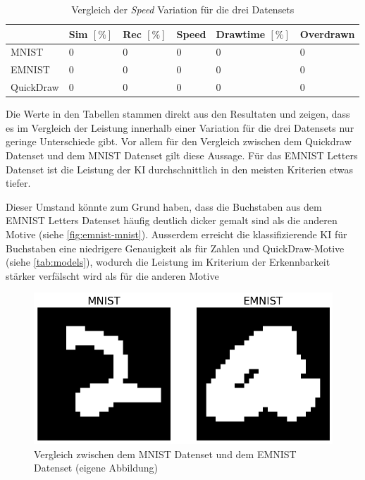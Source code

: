 \begin{table}[!ht]
    \centering
    \caption{Vergleich der \emph{Speed} Variation für die drei Datensets}\label{tab:speed-3-dataset}
    \begin{tabular}{|l|l|l|l|l|l|}
            \hline
            \hline ~ & Sim $[\%]$ & Rec $[\%]$ & Speed & Drawtime $[\%]$ & Overdrawn \\ \hline
            MNIST & 0 & 0 & 0 & 0 & 0 \\ \hline
            EMNIST & 0 & 0 & 0 & 0 & 0 \\ \hline
            QuickDraw & 0 & 0 & 0 & 0 & 0 \\ \hline
        \end{tabular}
\end{table}

Die Werte in den Tabellen stammen direkt aus den Resultaten und zeigen, dass es
im Vergleich der Leistung innerhalb einer Variation für die drei Datensets nur
geringe Unterschiede gibt. Vor allem für den Vergleich zwischen dem Quickdraw
Datenset und dem MNIST Datenset gilt diese Aussage. Für das EMNIST Letters
Datenset ist die Leistung der KI durchschnittlich in den meisten Kriterien etwas
tiefer.

Dieser Umstand könnte zum Grund haben, dass die Buchstaben aus dem EMNIST
Letters Datenset häufig deutlich dicker gemalt sind als die anderen Motive
(siehe \autoref{fig:emnist-mnist}). Ausserdem erreicht die klassifizierende KI
für Buchstaben eine niedrigere Genauigkeit als für Zahlen und QuickDraw-Motive
(siehe \autoref{tab:models}), wodurch die Leistung im Kriterium der
Erkennbarkeit stärker verfälscht wird als für die anderen Motive



\begin{figure}[!ht]
	\centering
	\includegraphics[width=\textwidth]{images/diskussion/emnist-mnist.png}
	\caption{Vergleich zwischen dem MNIST Datenset und dem EMNIST Datenset
	(eigene Abbildung)}\label{fig:emnist-mnist}
   \end{figure}

